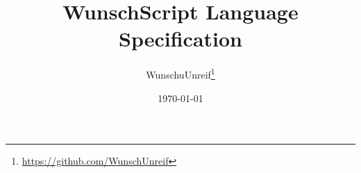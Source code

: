 \usepackage{url}
\usepackage{hyperref}
\usepackage{fancyhdr}

\newcommand{\WS}{{\sc WunschScript }}

\title{\WS Language Specification}
\author{WunschuUnreif\thanks{\url{https://github.com/WunschUnreif}}}
\date{\today}


\pagestyle{fancy}

